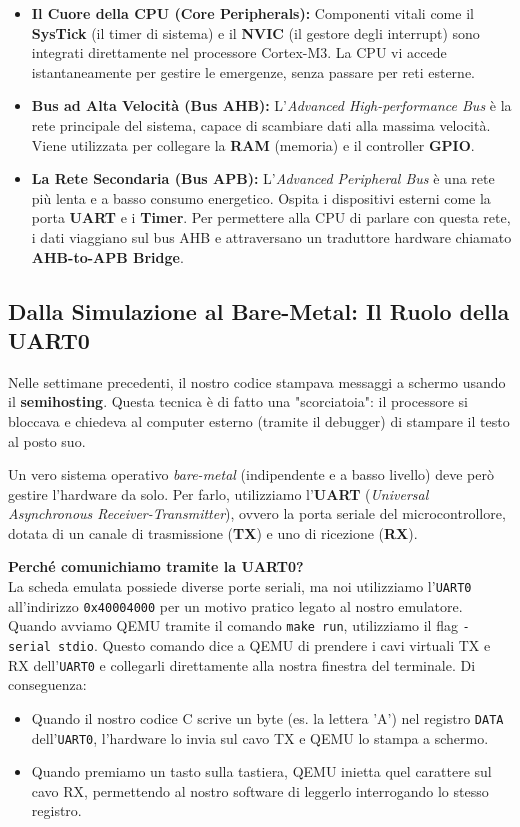 \begin{itemize}
    \item \textbf{Il Cuore della CPU (Core Peripherals):} Componenti vitali come il \textbf{SysTick} (il timer di sistema) e il \textbf{NVIC} (il gestore degli interrupt) sono integrati direttamente nel processore Cortex-M3. La CPU vi accede istantaneamente per gestire le emergenze, senza passare per reti esterne.
    \item \textbf{Bus ad Alta Velocità (Bus AHB):} L'\textit{Advanced High-performance Bus} è la rete principale del sistema, capace di scambiare dati alla massima velocità. Viene utilizzata per collegare la \textbf{RAM} (memoria) e il controller \textbf{GPIO}.
    \item \textbf{La Rete Secondaria (Bus APB):} L'\textit{Advanced Peripheral Bus} è una rete più lenta e a basso consumo energetico. Ospita i dispositivi esterni come la porta \textbf{UART} e i \textbf{Timer}. Per permettere alla CPU di parlare con questa rete, i dati viaggiano sul bus AHB e attraversano un traduttore hardware chiamato \textbf{AHB-to-APB Bridge}.
\end{itemize}

\subsection{Dalla Simulazione al Bare-Metal: Il Ruolo della UART0}
Nelle settimane precedenti, il nostro codice stampava messaggi a schermo usando il \textbf{semihosting}. Questa tecnica è di fatto una "scorciatoia": il processore si bloccava e chiedeva al computer esterno (tramite il debugger) di stampare il testo al posto suo.

Un vero sistema operativo \textit{bare-metal} (indipendente e a basso livello) deve però gestire l'hardware da solo. Per farlo, utilizziamo l'\textbf{UART} (\textit{Universal Asynchronous Receiver-Transmitter}), ovvero la porta seriale del microcontrollore, dotata di un canale di trasmissione (\textbf{TX}) e uno di ricezione (\textbf{RX}).

\textbf{Perché comunichiamo tramite la UART0?}\\
La scheda emulata possiede diverse porte seriali, ma noi utilizziamo l'\texttt{UART0} all'indirizzo \texttt{0x40004000} per un motivo pratico legato al nostro emulatore. Quando avviamo QEMU tramite il comando \texttt{make run}, utilizziamo il flag \texttt{-serial stdio}. 
Questo comando dice a QEMU di prendere i cavi virtuali TX e RX dell'\texttt{UART0} e collegarli direttamente alla nostra finestra del terminale. Di conseguenza:
\begin{itemize}
    \item Quando il nostro codice C scrive un byte (es. la lettera 'A') nel registro \texttt{DATA} dell'\texttt{UART0}, l'hardware lo invia sul cavo TX e QEMU lo stampa a schermo.
    \item Quando premiamo un tasto sulla tastiera, QEMU inietta quel carattere sul cavo RX, permettendo al nostro software di leggerlo interrogando lo stesso registro.
\end{itemize}

